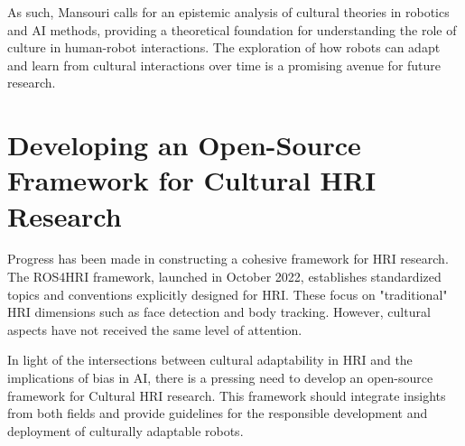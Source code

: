 As such, Mansouri \cite{mansouri2022} calls for an epistemic analysis of cultural theories in robotics and AI methods, providing a theoretical foundation for understanding the role of culture in human-robot interactions. The exploration of how robots can adapt and learn from cultural interactions over time is a promising avenue for future research. 

\section{Developing an Open-Source Framework for Cultural HRI Research}
Progress has been made in constructing a cohesive framework for HRI research. The ROS4HRI framework, launched in October 2022, establishes standardized topics and conventions explicitly designed for HRI. These focus on "traditional" HRI dimensions such as face detection and body tracking. However, cultural aspects have not received the same level of attention.

In light of the intersections between cultural adaptability in HRI and the implications of bias in AI, there is a pressing need to develop an open-source framework for Cultural HRI research. This framework should integrate insights from both fields and provide guidelines for the responsible development and deployment of culturally adaptable robots.
